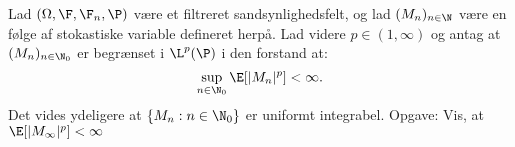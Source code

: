 

Lad $(\Omega, \F,\F_n,\P)$ være et filtreret sandsynlighedsfelt, og lad
$(M_n)_{n \in \N}$ være en følge af stokastiske variable defineret herpå. Lad
videre $p \in (1,\infty)$ og antag at $(M_n)_{n \in \N_0}$ er begrænset
i $\L^{p}(\P)$ i den forstand at:
\[
  \sup_{n \in \N_0} \E [|M_n|^{p}] <\infty
.\]
Det vides ydeligere at $\{ M_n : n \in \N_0\} $ er uniformt integrabel.
Opgave: Vis, at $\E [|M_\infty|^{p}] <\infty$


